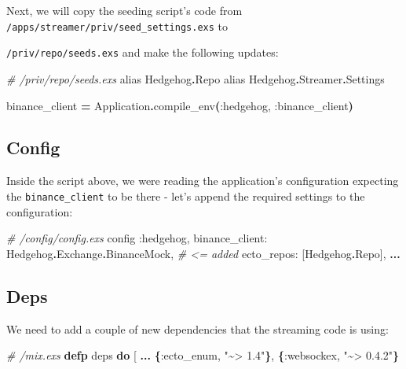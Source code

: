 \documentclass[
  oneside]{book}
\newenvironment{Shaded}{\begin{snugshade}}{\end{snugshade}}
\newcommand{\CommentTok}[1]{\textcolor[rgb]{0.56,0.35,0.01}{\textit{#1}}}
\newcommand{\ConstantTok}[1]{\textcolor[rgb]{0.56,0.35,0.01}{#1}}
\newcommand{\FunctionTok}[1]{\textcolor[rgb]{0.13,0.29,0.53}{\textbf{#1}}}
\newcommand{\ImportTok}[1]{#1}
\newcommand{\KeywordTok}[1]{\textcolor[rgb]{0.13,0.29,0.53}{\textbf{#1}}}
\newcommand{\NormalTok}[1]{#1}
\newcommand{\OperatorTok}[1]{\textcolor[rgb]{0.81,0.36,0.00}{\textbf{#1}}}
\newcommand{\OtherTok}[1]{\textcolor[rgb]{0.56,0.35,0.01}{#1}}
\newcommand{\StringTok}[1]{\textcolor[rgb]{0.31,0.60,0.02}{#1}}
\newcommand{\VariableTok}[1]{\textcolor[rgb]{0.00,0.00,0.00}{#1}}
\begin{document}
\newpage

Next, we will copy the seeding script's code from \texttt{/apps/streamer/priv/seed\_settings.exs} to

\texttt{/priv/repo/seeds.exs} and make the following updates:

\begin{Shaded}
\begin{Highlighting}[]
\CommentTok{\# /priv/repo/seeds.exs}
\ImportTok{alias} \ConstantTok{Hedgehog}\OperatorTok{.}\ConstantTok{Repo}
\ImportTok{alias} \ConstantTok{Hedgehog}\OperatorTok{.}\ConstantTok{Streamer}\OperatorTok{.}\ConstantTok{Settings}

\NormalTok{binance\_client }\OperatorTok{=} \ConstantTok{Application}\OperatorTok{.}\NormalTok{compile\_env}\FunctionTok{(}\VariableTok{:hedgehog}\NormalTok{, }\VariableTok{:binance\_client}\FunctionTok{)}
\end{Highlighting}
\end{Shaded}

\subsection{Config}\label{config}

Inside the script above, we were reading the application's configuration expecting the \texttt{binance\_client} to be there - let's append the required settings to the configuration:

\begin{Shaded}
\begin{Highlighting}[]
\CommentTok{\# /config/config.exs}
\NormalTok{config }\VariableTok{:hedgehog}\NormalTok{,}
  \VariableTok{binance\_client:} \ConstantTok{Hedgehog}\OperatorTok{.}\ConstantTok{Exchange}\OperatorTok{.}\ConstantTok{BinanceMock}\NormalTok{, }\CommentTok{\# \textless{}= added}
  \VariableTok{ecto\_repos:} \OtherTok{[}\ConstantTok{Hedgehog}\OperatorTok{.}\ConstantTok{Repo}\OtherTok{]}\NormalTok{,}
  \OperatorTok{...}
\end{Highlighting}
\end{Shaded}

\subsection{Deps}\label{deps}

We need to add a couple of new dependencies that the streaming code is using:

\begin{Shaded}
\begin{Highlighting}[]
\CommentTok{\# /mix.exs}
  \KeywordTok{defp}\NormalTok{ deps }\KeywordTok{do}
    \OtherTok{[}
      \OperatorTok{...}
      \FunctionTok{\{}\VariableTok{:ecto\_enum}\NormalTok{, }\StringTok{"\textasciitilde{}\textgreater{} 1.4"}\FunctionTok{\}}\NormalTok{,}
      \FunctionTok{\{}\VariableTok{:websockex}\NormalTok{, }\StringTok{"\textasciitilde{}\textgreater{} 0.4.2"}\FunctionTok{\}}
\end{Highlighting}
\end{Shaded}
\end{document}

